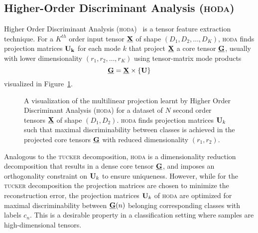 \documentclass[twocolumn]{article}
\begin{document}
\subsection{Higher-Order Discriminant Analysis (\textsc{hoda})}
Higher Order Discriminant Analysis (\textsc{hoda})~\cite{Phan2010} is a tensor
feature extraction technique. For a $K^{th}$ order input tensor $\underline{\mathbf{X}}$ of
shape $(D_1,D_2,\ldots,D_K)$, \textsc{hoda} finds projection matrices $\mathbf{U_k}$ for each mode $k$
that project $\underline{\mathbf{X}}$ a core tensor $\underline{\mathbf{G}}$, usually with lower
dimensionality $(r_1,r_2,\ldots,r_K)$ using tensor-matrix mode products
\begin{equation}
	\underline{\mathbf{G}}  = \underline{\mathbf{X}}\times\{\mathbf{U}\}
	\label{eq:hoda-backward}
\end{equation}
visualized in Figure~\ref{fig:hoda-backward}.
\begin{figure}
	\centering
	
	\caption{A visualization of the multilinear projection learnt by Higher Order
		Discriminant Analysis (\textsc{hoda}) for a dataset of $N$ second order tensors
		$\underline{\mathbf{X}}$ of shape $(D_1,D_2)$.
		\textsc{hoda} finds projection matrices $\mathbf{U}_k$ such that maximal
		discriminability between classes is achieved in the projected core tensors
		$\underline{\mathbf{G}}$ with reduced dimensionality $(r_1,r_2)$.}
	\label{fig:hoda-backward}
\end{figure}
Analogous to the \textsc{tucker} decomposition, \textsc{hoda} is a dimensionality
reduction decomposition that results in a dense core tensor $\underline{\mathbf{G}}$, and
imposes an orthogonality constraint on $\mathbf{U}_k$ to ensure uniqueness.
However, while for the \textsc{tucker} decomposition the projection matrices
are chosen to minimize the reconstruction error, the projection matrices
$\mathbf{U}_k$ of \textsc{hoda} are optimized for maximal discriminability between
$\underline{\mathbf{G}}(n)$ belonging corresponding classes with labels $c_n$.
This is a desirable property in a classification setting where samples are
high-dimensional tensors.
\end{document}
